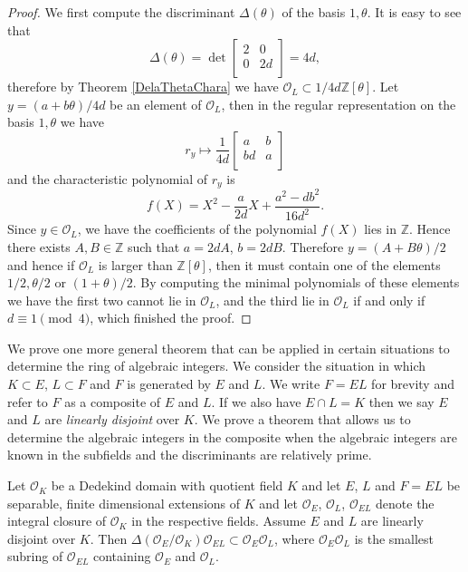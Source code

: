\begin{proof}
We first compute the discriminant $\Delta(\theta)$ of the basis $1,\theta$. It is easy to see that 
$$
\Delta \left( \theta \right) =\det \left[ \begin{matrix}
	2&		0\\
	0&		2d\\
\end{matrix} \right] =4d,
$$
therefore by Theorem \ref{DelaThetaChara} we have $\mathcal{O}_L\subset 1/4d\mathbb{Z}[\theta]$. Let $y=(a+b\theta)/4d$ be an element of $\mathcal{O}_L$, then in the regular representation on the basis $1,\theta$ we have 
$$
r_y\mapsto \frac{1}{4d}\left[ \begin{matrix}
	a&		b\\
	bd&		a\\
\end{matrix} \right] 
$$
and the characteristic polynomial of $r_y$ is 
$$
f\left( X \right) =X^2-\frac{a}{2d}X+\frac{a^2-db^2}{16d^2}.
$$
Since $y\in\mathcal{O}_L$, we have the coefficients of the polynomial $f(X)$ lies in $\mathbb{Z}$. Hence there exists $A,B\in\mathbb{Z}$ such that $a=2dA$, $b=2dB$. Therefore $y=(A+B\theta)/2$ and hence if $\mathcal{O}_L$ is larger than $\mathbb{Z}[\theta]$, then it must contain one of the elements $1/2,\theta/2$ or $(1+\theta)/2$. By computing the minimal polynomials of these elements we have the first two cannot lie in $\mathcal{O}_L$, and the third lie in $\mathcal{O}_L$ if and only if $d\equiv 1\pmod{4}$, which finished the proof.
\end{proof}
We prove one more general theorem that can be applied in certain situations to determine the ring of algebraic integers. We consider the situation in which $K\subset E$, $L\subset F$ and $F$ is generated by $E$ and $L$. We write $F=EL$ for brevity and refer to $F$ as a composite of $E$ and $L$. If we also have $E\cap L=K$ then we say $E$ and $L$ are \textit{linearly disjoint} over $K$. We prove a theorem that allows us to determine the algebraic integers in the composite when the algebraic integers are known in the subfields and the discriminants are relatively prime.
\begin{theorem}\label{DelInclusion}
Let $\mathcal{O}_K$ be a Dedekind domain with quotient field $K$ and let $E$, $L$ and $F=EL$ be separable, finite dimensional extensions of $K$ and let $\mathcal{O}_E$, $\mathcal{O}_L$, $\mathcal{O}_{EL}$ denote the integral closure of $\mathcal{O}_K$ in the respective fields. Assume $E$ and $L$ are linearly disjoint over $K$. Then $\Delta(\mathcal{O}_E/\mathcal{O}_K)\mathcal{O}_{EL}\subset\mathcal{O}_E\mathcal{O}_L$, where $\mathcal{O}_E\mathcal{O}_L$ is the smallest subring of $\mathcal{O}_{EL}$ containing $\mathcal{O}_E$ and $\mathcal{O}_L$.
\end{theorem}
